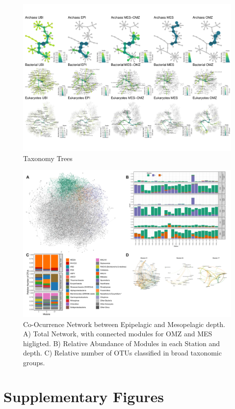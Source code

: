 \documentclass[fleqn,10pt]{wlscirep}
\begin{document}
\clearpage
\begin{figure}[ht]
    \centering
    \includegraphics[scale=0.7,angle=90,origin=c]{images/hmap_general_pub.pdf}
    \caption{Taxonomy Trees}
    \label{fig:tax_trees}
\end{figure}
\clearpage
\begin{figure}[ht]
    \centering
    \includegraphics[scale=0.5]{images/Networks_Composite.pdf}
    \caption{Co-Ocurrence Network between Epipelagic and Mesopelagic depth. A) Total Network, with connected modules for OMZ and MES higligted. B) Relative Abundance of Modules in each Station and depth. C) Relative number of OTUs classified in broad taxonomic groups.}
    \label{fig:networks}
\end{figure}
\clearpage
\section*{Supplementary Figures}
\end{document}
